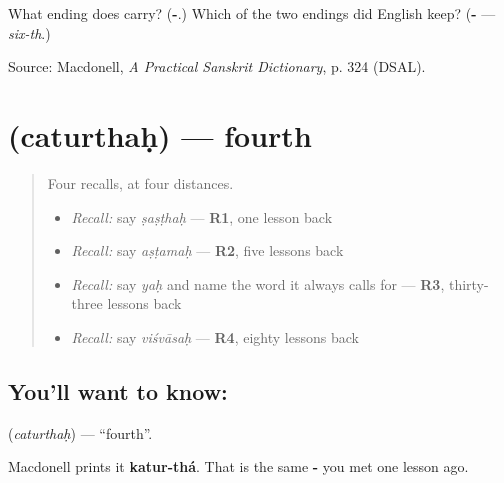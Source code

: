 \begin{tcolorbox}[breakable,colback=teal!4,colframe=teal!35!black,title={Before you move on}]
What ending does \textbf{} carry? (\textbf{-}.) Which of the two endings did English keep? (\textbf{-} — \emph{six-th}.)

Source: Macdonell, \emph{A Practical Sanskrit Dictionary}, p. 324 (DSAL).
\end{tcolorbox}
\section[\texorpdfstring{\sk{चतुर्थः} (caturthaḥ)}{चतुर्थः (caturthaḥ)}]{ (caturthaḥ) — fourth}

\label{lesson:SA-C63-fourth}



\begin{quote}
Four recalls, at four distances.

\begin{itemize}
\raggedright
  \item \emph{Recall:} say \emph{ṣaṣṭhaḥ} — \textbf{R1}, one lesson back
  \item \emph{Recall:} say \emph{aṣṭamaḥ} — \textbf{R2}, five lessons back
  \item \emph{Recall:} say \emph{yaḥ} and name the word it always calls for — \textbf{R3}, thirty-three lessons back
  \item \emph{Recall:} say \emph{viśvāsaḥ} — \textbf{R4}, eighty lessons back
\end{itemize}
\end{quote}

\subsection*{You'll want to know: }
\textbf{} (\emph{caturthaḥ}) — \textquotedblleft{}fourth\textquotedblright{}.

Macdonell prints it \textbf{katur-thá}. That is the same \textbf{-} you met one lesson ago.

